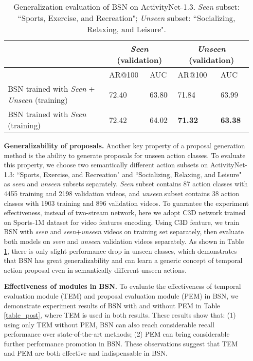 \documentclass[runningheads]{llncs}
\begin{document}
\begin{table}[tbp]
\centering
\caption{  Generalization evaluation of BSN on ActivityNet-1.3. \emph{Seen} subset: ``Sports, Exercise, and Recreation";  \emph{Unseen} subset: ``Socializing, Relaxing, and Leisure".  }
\begin{tabular}{m{5.5cm}m{1.5cm}<{\centering}m{1.5cm}<{\centering}m{1.5cm}<{\centering}m{1.5cm}<{\centering}}
\toprule
 & \multicolumn{2}{c}{\emph{Seen} (validation)} & \multicolumn{2}{c}{\emph{Unseen} (validation)}  \\
\hline   &  AR@100  & AUC & AR@100 & AUC \\
\hline 
BSN trained with \emph{Seen} + \emph{Unseen} (training)  	&  72.40  & 63.80 & 71.84 & 63.99 \\
BSN trained with \emph{Seen} (training)   			&  72.42  & 64.02 & {\bf 71.32}   & {\bf 63.38} \\
\bottomrule
\end{tabular}
\label{table_gene}
\vspace{-0.6cm}
\end{table}


\noindent
{\bf Generalizability of proposals.} Another key property of a proposal generation method  is the ability to generate proposals for unseen action classes. 
To evaluate this property, we choose two  semantically different action subsets on ActivityNet-1.3: ``Sports, Exercise, and Recreation" and ``Socializing, Relaxing, and Leisure" as \emph{seen} and \emph{unseen} subsets separately. \emph{Seen} subset contains 87 action classes with 4455  training and 2198 validation videos, and \emph{unseen} subset contains 38 action classes with 1903  training and 896 validation videos. 
To guarantee the experiment effectiveness, instead of two-stream network, here we adopt C3D network \cite{tran2017convnet} trained on Sports-1M dataset \cite{sports1m} for video features encoding. Using C3D feature, we train BSN with \emph{seen} and \emph{seen}+\emph{unseen} videos on training set separately, then evaluate both models on \emph{seen} and \emph{unseen} validation videos separately.
As shown in Table \ref{table_gene},  there is only slight performance drop in unseen classes, which demonstrates that BSN  has great generalizability and can learn a generic concept of temporal action proposal even in semantically different unseen actions.

\noindent
{\bf Effectiveness of modules in BSN.}
To evaluate the effectiveness of  temporal evaluation module (TEM) and proposal evaluation module (PEM) in BSN, we demonstrate experiment results of BSN with and without PEM in Table \ref{table_post}, where TEM is used in both results. These results show that: (1) using only TEM without PEM, BSN can also reach considerable recall performance over  state-of-the-art methods; (2) PEM can bring considerable further  performance promotion in BSN. These observations suggest that TEM and PEM are both effective and indispensable in BSN.
\end{document}
